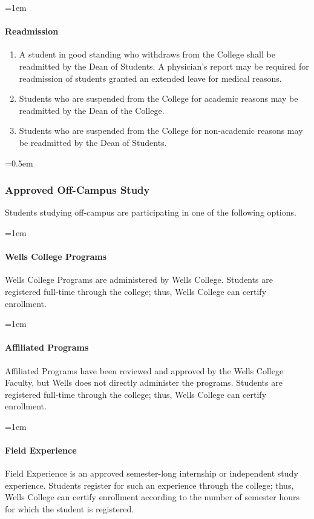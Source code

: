 \documentclass{manual}
\let\oldsubsubsection\subsubsection
\renewcommand\subsubsection{\leftskip=0.5em\oldsubsubsection}
\let\oldparagraph\paragraph
\renewcommand\paragraph{\leftskip=1em\oldparagraph}
\begin{document}
\paragraph{Readmission}

	\begin{enumerate}[label=\alph*)]
	\item A student in good standing who withdraws from the College shall be readmitted by the Dean of Students. A physician's report may be required for readmission of students granted an extended leave for medical reasons.
	\item Students who are suspended from the College for academic reasons may be readmitted by the Dean of the College.
	\item Students who are suspended from the College for non-academic reasons may be readmitted by the Dean of Students.
	\end{enumerate}

\subsubsection{Approved Off-Campus Study}
Students studying off-campus are participating in one of the following options.

\paragraph{Wells College Programs}
Wells College Programs are administered by Wells College. Students are registered full-time through the college; thus, Wells College can certify enrollment.

\paragraph{Affiliated Programs}
Affiliated Programs have been reviewed and approved by the Wells College Faculty, but Wells does not directly administer the programs. Students are registered full-time through the college; thus, Wells College can certify enrollment.

\paragraph{Field Experience}
Field Experience is an approved semester-long internship or independent study experience. Students register for such an experience through the college; thus, Wells College can certify enrollment according to the number of semester hours for which the student is registered.
\end{document}
